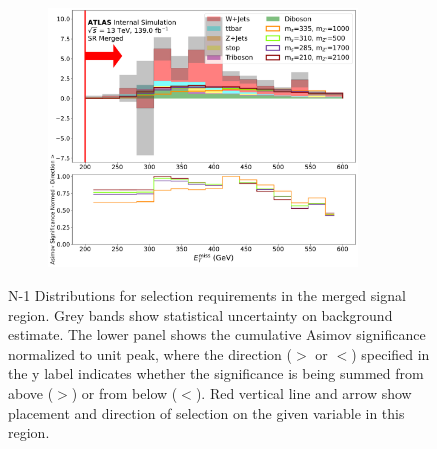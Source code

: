 \begin{figure}[htbp]
\begin{subfigure}[t]{0.48\textwidth}
     \includegraphics[width = 0.9\textwidth]{Figures/5/SR1L_Merged/MetTST_met_normSig_N_1.pdf}
    \caption{\met}
    \end{subfigure}
   \caption{N-1 Distributions for selection requirements in the merged signal region. Grey bands show statistical uncertainty on background estimate. The lower panel shows the cumulative Asimov significance normalized to unit peak, where the direction (\(>\) or \(<\)) specified in the y label indicates whether the significance is being summed from above (\(>\)) or from below (\(<\)). Red vertical line and arrow show placement and direction of selection on the given variable in this region.}
   \label{fig:Nminus1mergedSR}
\end{figure}
